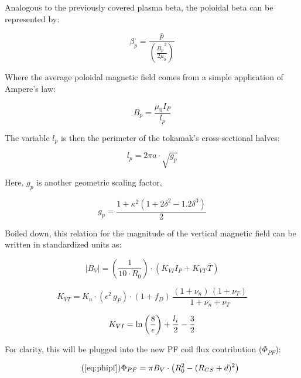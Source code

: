 Analogous to the previously covered plasma beta, the poloidal beta can be represented by:

\begin{equation}
  \beta_p = \frac{\overline{p}}{\left( \frac{\overline{B_p}^{\,2}}{2 \mu_0} \right)}
\end{equation}

Where the average poloidal magnetic field comes from a simple application of Ampere's law:

\begin{equation}
	\overline{B_p} = \frac{\mu_0 I_P}{l_p}
\end{equation}

The variable $l_p$ is then the perimeter of the tokamak's cross-sectional halves:

\begin{equation}
	l_p = 2 \pi a \cdot \sqrt{g_p}
\end{equation}

Here, $g_p$ is another geometric scaling factor,

\begin{equation}
  g_p = \frac{1 + \kappa^2 ( 1 + 2 \delta^2 - 1.2\delta^3 )}{2} 
\end{equation}

Boiled down, this relation for the magnitude of the vertical magnetic field can be written in standardized units as:

\begin{equation}
	|B_V| = \left( \frac{ 1 }{ 10 \cdot R_0} \right) \cdot \left( K_{VI} I_P +  K_{VT\,} \overline{T}  \right)
\end{equation}

\begin{equation}
	K_{VT} = K_{n} \cdot ( \epsilon ^ 2 \, g_P ) \cdot ( 1 + f_D ) \, \frac{ (1 + \nu_n) \, (1 + \nu_T) }{1 + \nu_n + \nu_T }
\end{equation}

\begin{equation}
	K_{VI} = \textnormal{ln} \left(\frac{8}{\epsilon}\right) + \frac{l_i}{2} - \frac{3}{2}
\end{equation}

For clarity, this will be plugged into the new PF coil flux contribution ($\Phi_{PF}$):

\begin{equation}
	\tag{\ref{eq:phipf}}
	\Phi_{PF} = \pi B_V \cdot \left( R_0^2 - ( R_{CS} + d ) ^ 2 \right)
\end{equation}

